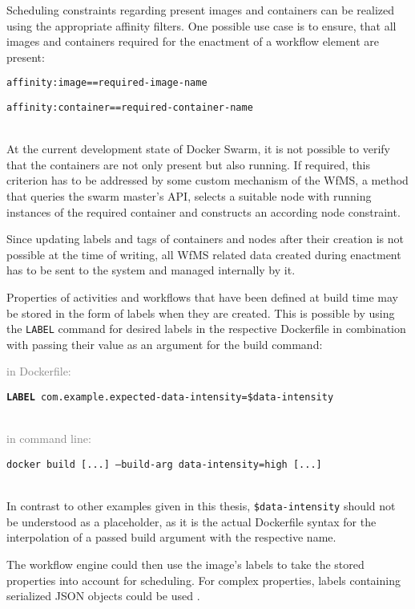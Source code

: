     Scheduling constraints regarding present images and containers can be realized using the appropriate affinity filters. One possible use case is to ensure, that all images and containers required for the enactment of a workflow element are present:
    \\ [0.5ex]
    \centerline{\texttt{affinity:image==required-image-name}}
    \centerline{\texttt{affinity:container==required-container-name}}
    \\ [0.5ex]
    At the current development state of Docker Swarm, it is not possible to verify that the containers are not only present but also running. If required, this criterion has to be addressed by some custom mechanism of the \ac{WfMS}, \eg a method that queries the swarm master's \ac{API}, selects a suitable node with running instances of the required container and constructs an according node constraint.

    Since updating labels and tags of containers and nodes after their creation is not possible at the time of writing, all \ac{WfMS} related data created during enactment has to be sent to the system and managed internally by it.

    Properties of activities and workflows that have been defined at build time may be stored in the form of labels when they are created. This is possible by using the \texttt{LABEL} command for desired labels in the respective Dockerfile in combination with passing their value as an argument for the build command:

    \textcolor{gray}{in Dockerfile:}
    \\ [0.5ex]
    \centerline{\texttt{\textbf{LABEL} com.example.expected-data-intensity=\$data-intensity}}
    \\ [0.5ex]
    \textcolor{gray}{in command line:}
    \\ [0.5ex]
    \centerline{\texttt{docker build [...] --build-arg data-intensity=high [...]}}
    \\ [0.5ex]
    In contrast to other examples given in this thesis, \texttt{\$data-intensity} should not be understood as a placeholder, as it is the actual Dockerfile syntax for the interpolation of a passed build argument with the respective name.

    The workflow engine could then use the image's labels to take the stored properties into account for scheduling. For complex properties, labels containing serialized JSON objects could be used \cite{Docker2016Docker}.

